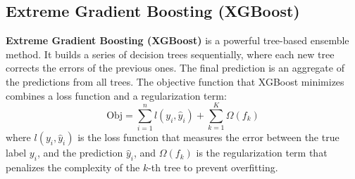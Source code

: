\subsection{Extreme Gradient Boosting (XGBoost)}
\textbf{Extreme Gradient Boosting (XGBoost)} is a powerful tree-based ensemble method. It builds a series of decision trees sequentially, where each new tree corrects the errors of the previous ones. The final prediction is an aggregate of the predictions from all trees. The objective function that XGBoost minimizes combines a loss function and a regularization term:
$$\text{Obj} = \sum_{i=1}^{n} l(y_i, \hat{y}_i) + \sum_{k=1}^{K} \Omega(f_k)$$
where $l(y_i, \hat{y}_i)$ is the loss function that measures the error between the true label $y_i$, and the prediction $\hat{y}_i$, and $\Omega(f_k)$ is the regularization term that penalizes the complexity of the $k$-th tree to prevent overfitting.




